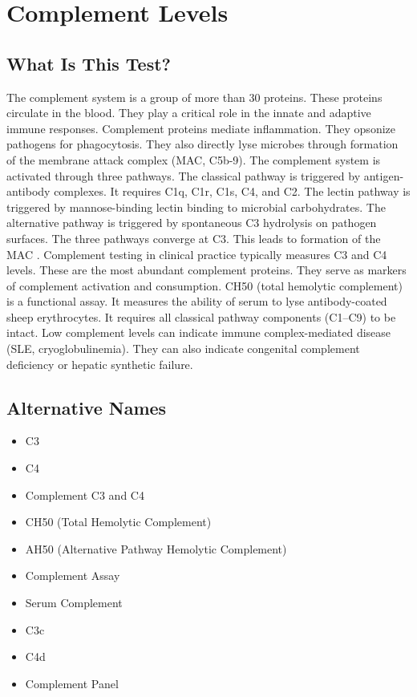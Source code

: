 \chapter{Complement Levels}

\section*{What Is This Test?}
The complement system is a group of more than 30 proteins. These proteins circulate in the blood. They play a critical role in the innate and adaptive immune responses. Complement proteins mediate inflammation. They opsonize pathogens for phagocytosis. They also directly lyse microbes through formation of the membrane attack complex (MAC, C5b-9). The complement system is activated through three pathways. The classical pathway is triggered by antigen-antibody complexes. It requires C1q, C1r, C1s, C4, and C2. The lectin pathway is triggered by mannose-binding lectin binding to microbial carbohydrates. The alternative pathway is triggered by spontaneous C3 hydrolysis on pathogen surfaces. The three pathways converge at C3. This leads to formation of the MAC \cite{ricklin2010complement}. Complement testing in clinical practice typically measures C3 and C4 levels. These are the most abundant complement proteins. They serve as markers of complement activation and consumption. CH50 (total hemolytic complement) is a functional assay. It measures the ability of serum to lyse antibody-coated sheep erythrocytes. It requires all classical pathway components (C1--C9) to be intact. Low complement levels can indicate immune complex-mediated disease (SLE, cryoglobulinemia). They can also indicate congenital complement deficiency or hepatic synthetic failure.

\section*{Alternative Names}
\begin{itemize}
  \item C3
  \item C4
  \item Complement C3 and C4
  \item CH50 (Total Hemolytic Complement)
  \item AH50 (Alternative Pathway Hemolytic Complement)
  \item Complement Assay
  \item Serum Complement
  \item C3c
  \item C4d
  \item Complement Panel
\end{itemize}
